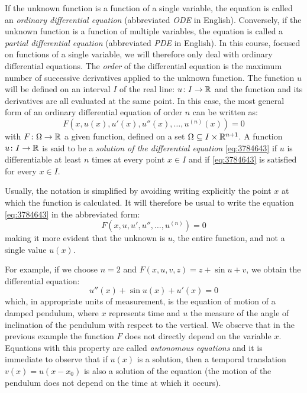 If the unknown function is a function of a single variable, the equation is
called an
\emph{ordinary differential equation}
%
%
(abbreviated
\emph{ODE} %
in English).
Conversely, if the unknown function is a function of multiple variables, the
equation is called a
\emph{partial differential equation}
%
%
(abbreviated \emph{PDE}
 in English).
In this course, focused on functions of a single variable, we will therefore
only deal with ordinary differential equations.
The \emph{order}
%
%
%
of the differential equation is the maximum number of successive derivatives
applied to the unknown function.
The function $u$ will be defined on an interval $I$ of the real line: $u\colon I
\to {\mathbb R}$
and the function and its derivatives are all evaluated at the same point. In
this case,
the most general form of an ordinary differential equation of order $n$ can be
written as:
\begin{equation}\label{eq:3784643}
  F(x,u(x),u'(x),u''(x), \dots, u^{(n)}(x)) = 0
\end{equation}
with $F\colon \Omega \to {\mathbb R}$ a given function, defined on a set $\Omega \subseteq
I\times {\mathbb R}^{n+1}$.
A function $u\colon I \to {\mathbb R}$ is said to be a \emph{solution
of the differential equation} \eqref{eq:3784643} if $u$ is differentiable at
least
$n$ times at every point $x\in I$ and if \eqref{eq:3784643} is satisfied
for every $x\in I$.

Usually, the notation is simplified by avoiding writing explicitly
the point $x$ at which the function is calculated.
It will therefore be usual
to write the equation \eqref{eq:3784643}
in the abbreviated form:
\[
  F(x,u,u',u'', \dots, u^{(n)}) = 0
\]
making it more evident that the unknown is $u$,
the entire function, and not a single value $u(x)$.

For example, if we choose $n=2$ and $F(x,u,v,z)= z+\sin u + v$, we obtain the
differential equation:
\begin{equation}\label{eq:39872}
 u''(x) + \sin u(x) + u'(x) = 0
\end{equation}
which, in appropriate units of measurement, is the equation of motion of a
damped pendulum,
where $x$ represents time and $u$ the measure of the angle of inclination of the
pendulum with respect to the vertical.
We observe that in the previous example the function $F$ does not directly
depend
on the variable $x$. Equations with this property are called
\emph{autonomous equations}
and it is immediate to observe that if $u(x)$ is a solution, then a temporal
translation
$v(x) = u(x-x_0)$ is also a solution of the equation
(the motion of the pendulum does not depend on the time at which it occurs).

